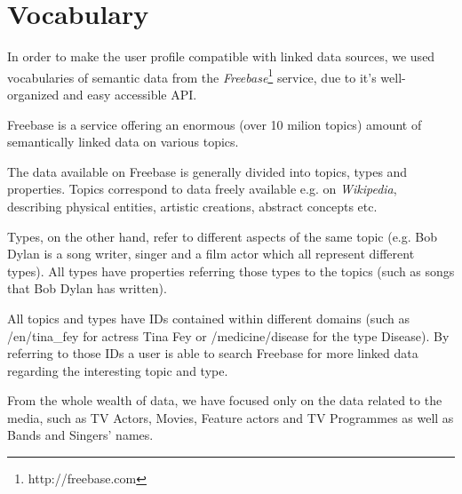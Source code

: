 \section{Vocabulary}

In order to make the user profile compatible with linked data sources, we used
vocabularies of semantic data from the \textit{Freebase}\footnote[1]{http://freebase.com} service, due to it's
well-organized and easy accessible API.

Freebase is a service offering an enormous (over 10 milion topics) amount
of semantically linked data on various topics.

The data available on Freebase is generally divided into topics, types and properties. Topics correspond to data freely
available e.g. on \textit{Wikipedia}, describing physical entities, artistic creations, abstract concepts etc.

Types, on the other hand, refer to different aspects of the same topic (e.g. Bob Dylan is a song writer,
singer and a film actor which all represent different types). All types have properties referring those
types to the topics (such as songs that Bob Dylan has written).

All topics and types have IDs contained within different domains (such as /en/tina\_fey for actress Tina Fey
or /medicine/disease for the type Disease). By referring to those IDs a user is able to search Freebase for
more linked data regarding the interesting topic and type.

From the whole wealth of data, we have focused only on the data related to the media, such as TV Actors, Movies, Feature
actors and TV Programmes as well as Bands and Singers' names.